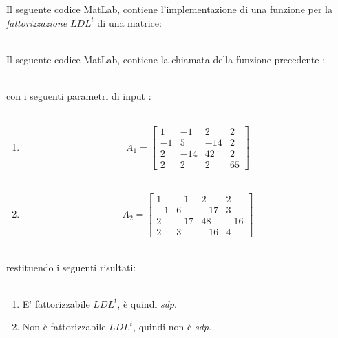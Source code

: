 Il seguente codice MatLab, contiene l'implementazione di una funzione per la \textit{fattorizzazione} $LDL^t$ di una matrice:\\\

Il seguente codice MatLab, contiene la chiamata della funzione precedente :\\\

con i seguenti parametri di input :\\\
\begin{enumerate}
\item
\[
A_1 =\begin{bmatrix}
	1  & -1  & 2   & 2  \\ 
	-1 & 5   & -14 & 2  \\
	2  & -14 & 42  & 2  \\
	2  & 2   & 2   & 65 
\end{bmatrix}
\]\\
\item
\[
A_2 =\begin{bmatrix}
	1  & -1  & 2   & 2   \\ 
	-1 & 6   & -17 & 3   \\
	2  & -17 & 48  & -16 \\
	2  & 3   & -16 & 4   
\end{bmatrix}
\]\\
\end{enumerate}
restituendo i seguenti risultati:\\\
\begin{enumerate}
\item
E' fattorizzabile $LDL^t$, è quindi \textit{sdp}.
\item
Non è fattorizzabile $LDL^t$, quindi non è \textit{sdp}.
\end{enumerate}
